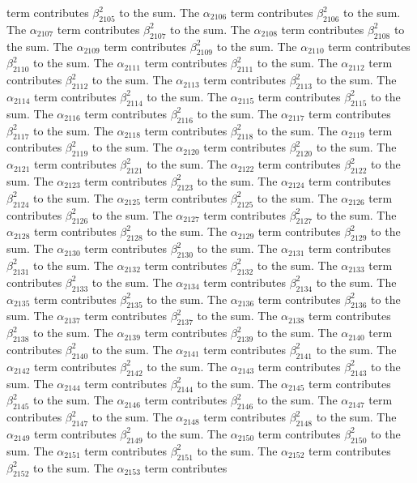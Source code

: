 \begin{lemma}
term contributes $\beta_{2105}^{2}$ to the sum. The $\alpha_{2106}$ term contributes $\beta_{2106}^{2}$ to the sum. The $\alpha_{2107}$ term contributes $\beta_{2107}^{2}$ to the sum. The $\alpha_{2108}$ term contributes $\beta_{2108}^{2}$ to the sum. The $\alpha_{2109}$ term contributes $\beta_{2109}^{2}$ to the sum. The $\alpha_{2110}$ term contributes $\beta_{2110}^{2}$ to the sum. The $\alpha_{2111}$ term contributes $\beta_{2111}^{2}$ to the sum. The $\alpha_{2112}$ term contributes $\beta_{2112}^{2}$ to the sum. The $\alpha_{2113}$ term contributes $\beta_{2113}^{2}$ to the sum. The $\alpha_{2114}$ term contributes $\beta_{2114}^{2}$ to the sum. The $\alpha_{2115}$ term contributes $\beta_{2115}^{2}$ to the sum. The $\alpha_{2116}$ term contributes $\beta_{2116}^{2}$ to the sum. The $\alpha_{2117}$ term contributes $\beta_{2117}^{2}$ to the sum. The $\alpha_{2118}$ term contributes $\beta_{2118}^{2}$ to the sum. The $\alpha_{2119}$ term contributes $\beta_{2119}^{2}$ to the sum. The $\alpha_{2120}$ term contributes $\beta_{2120}^{2}$ to the sum. The $\alpha_{2121}$ term contributes $\beta_{2121}^{2}$ to the sum. The $\alpha_{2122}$ term contributes $\beta_{2122}^{2}$ to the sum. The $\alpha_{2123}$ term contributes $\beta_{2123}^{2}$ to the sum. The $\alpha_{2124}$ term contributes $\beta_{2124}^{2}$ to the sum. The $\alpha_{2125}$ term contributes $\beta_{2125}^{2}$ to the sum. The $\alpha_{2126}$ term contributes $\beta_{2126}^{2}$ to the sum. The $\alpha_{2127}$ term contributes $\beta_{2127}^{2}$ to the sum. The $\alpha_{2128}$ term contributes $\beta_{2128}^{2}$ to the sum. The $\alpha_{2129}$ term contributes $\beta_{2129}^{2}$ to the sum. The $\alpha_{2130}$ term contributes $\beta_{2130}^{2}$ to the sum. The $\alpha_{2131}$ term contributes $\beta_{2131}^{2}$ to the sum. The $\alpha_{2132}$ term contributes $\beta_{2132}^{2}$ to the sum. The $\alpha_{2133}$ term contributes $\beta_{2133}^{2}$ to the sum. The $\alpha_{2134}$ term contributes $\beta_{2134}^{2}$ to the sum. The $\alpha_{2135}$ term contributes $\beta_{2135}^{2}$ to the sum. The $\alpha_{2136}$ term contributes $\beta_{2136}^{2}$ to the sum. The $\alpha_{2137}$ term contributes $\beta_{2137}^{2}$ to the sum. The $\alpha_{2138}$ term contributes $\beta_{2138}^{2}$ to the sum. The $\alpha_{2139}$ term contributes $\beta_{2139}^{2}$ to the sum. The $\alpha_{2140}$ term contributes $\beta_{2140}^{2}$ to the sum. The $\alpha_{2141}$ term contributes $\beta_{2141}^{2}$ to the sum. The $\alpha_{2142}$ term contributes $\beta_{2142}^{2}$ to the sum. The $\alpha_{2143}$ term contributes $\beta_{2143}^{2}$ to the sum. The $\alpha_{2144}$ term contributes $\beta_{2144}^{2}$ to the sum. The $\alpha_{2145}$ term contributes $\beta_{2145}^{2}$ to the sum. The $\alpha_{2146}$ term contributes $\beta_{2146}^{2}$ to the sum. The $\alpha_{2147}$ term contributes $\beta_{2147}^{2}$ to the sum. The $\alpha_{2148}$ term contributes $\beta_{2148}^{2}$ to the sum. The $\alpha_{2149}$ term contributes $\beta_{2149}^{2}$ to the sum. The $\alpha_{2150}$ term contributes $\beta_{2150}^{2}$ to the sum. The $\alpha_{2151}$ term contributes $\beta_{2151}^{2}$ to the sum. The $\alpha_{2152}$ term contributes $\beta_{2152}^{2}$ to the sum. The $\alpha_{2153}$ term contributes 
\end{lemma}
